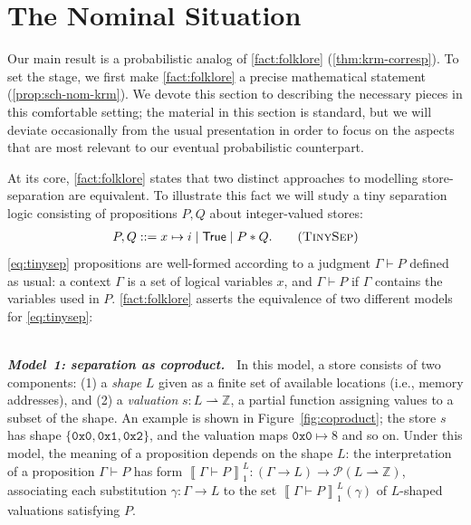 \documentclass[
  sigconf,
  screen, ]{acmart}
\theoremstyle{definition}
\newcommand\calP{\mathcal P}
\newcommand\llbr[1]{\left\llbracket #1\right\rrbracket}
\newcommand\Z{\mathbb Z}
\newcommand\goodparagraph[1]{\hspace{0em}\\[-0.5em]\textbf{\textit{#1.~}}}
\newcommand\trueprop{\mathsf{True}}
\newcommand\hexnum[1]{\texttt{0x#1}}
\newcommand\sepcon{\mathbin{*}}
\begin{document}
\section{The Nominal Situation} \label{sec:nom-situation}

Our main result
is a probabilistic analog
of \cref{fact:folklore} (\cref{thm:krm-corresp}).
To set the stage, we first make \cref{fact:folklore}
a precise mathematical statement (\cref{prop:sch-nom-krm}).
We devote this section to describing the necessary pieces in 
this comfortable setting;
the material in this section is standard, but we will deviate
occasionally from the usual presentation in order to
focus on the aspects that are most relevant
to our eventual probabilistic counterpart.

At its core, \cref{fact:folklore} states that two
distinct approaches to modelling store-separation
are equivalent.
To illustrate this fact we will study
a tiny separation logic
consisting of propositions $P,Q$ about integer-valued stores:
\begin{align}
P,Q ::= x\mapsto i \mid \trueprop \mid P\sepcon Q.
\tag{\textsc{TinySep}}
\label{eq:tinysep}
\end{align}
\ref{eq:tinysep} propositions are well-formed according to a judgment $\Gamma\vdash P$
defined as usual:
a context $\Gamma$ is a set of logical variables $x$,
and $\Gamma \vdash P$
if $\Gamma$ contains the variables used in $P$.
\cref{fact:folklore} asserts the equivalence of
two different models for \ref{eq:tinysep}:

\newcommand\modelsh[2]{\llbr{#1}_1^{#2}}
\newcommand\modelgset[1]{\llbr{#1}_2}
\goodparagraph{Model~1: separation as coproduct}
  In this model, a store consists of two components: (1) a \emph{shape} $L$
  given as a finite set of available locations (i.e., memory addresses), and (2)
  a \emph{valuation} $s : L\rightharpoonup \Z$, a partial function assigning
  values to a subset of the shape. An example is shown in Figure~\ref{fig:coproduct};
  the store $s$ has shape $\{\hexnum0,\hexnum1, \hexnum2\}$, and the 
  valuation maps $\hexnum0 \mapsto 8$ and so on.
  Under this model, the meaning of a proposition
  depends on the shape $L$:
  the interpretation of a proposition $\Gamma \vdash P$
  has form $\modelsh{\Gamma\vdash P}L: (\Gamma\to L)\to \calP(L\rightharpoonup\Z)$,
  associating each substitution $\gamma : \Gamma\to L$ to
  the set $\modelsh{\Gamma\vdash P}L(\gamma)$ of $L$-shaped valuations
  satisfying $P$.
\end{document}
